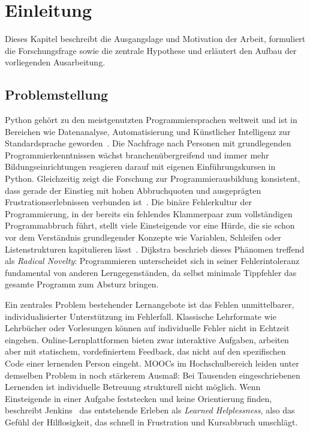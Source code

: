 \clearpage

\chapter{\textbf{Einleitung}}\label{ch:einleitung}

Dieses Kapitel beschreibt die Ausgangslage und Motivation der Arbeit, formuliert die Forschungsfrage sowie die zentrale Hypothese und erläutert den Aufbau der vorliegenden Ausarbeitung.

\section{Problemstellung}\label{sec:problemstellung}

Python gehört zu den meistgenutzten Programmiersprachen weltweit und ist in Bereichen wie Datenanalyse, Automatisierung und Künstlicher Intelligenz zur Standardsprache geworden~\cite{stackoverflow2024}. Die Nachfrage nach Personen mit grundlegenden Programmierkenntnissen wächst branchenübergreifend und immer mehr Bildungseinrichtungen reagieren darauf mit eigenen Einführungskursen in Python. Gleichzeitig zeigt die Forschung zur Programmierausbildung konsistent, dass gerade der Einstieg mit hohen Abbruchquoten und ausgeprägten Frustrationserlebnissen verbunden ist~\cite{bennedsen2007}. Die binäre Fehlerkultur der Programmierung, in der bereits ein fehlendes Klammerpaar zum vollständigen Programmabbruch führt, stellt viele Einsteigende vor eine Hürde, die sie schon vor dem Verständnis grundlegender Konzepte wie Variablen, Schleifen oder Listenstrukturen kapitulieren lässt~\cite{jenkins2002}. Dijkstra beschrieb dieses Phänomen treffend als \textit{Radical Novelty}: Programmieren unterscheidet sich in seiner Fehlerintoleranz fundamental von anderen Lerngegenständen, da selbst minimale Tippfehler das gesamte Programm zum Absturz bringen.

Ein zentrales Problem bestehender Lernangebote ist das Fehlen unmittelbarer, individualisierter Unterstützung im Fehlerfall. Klassische Lehrformate wie Lehrbücher oder Vorlesungen können auf individuelle Fehler nicht in Echtzeit eingehen. Online-Lernplattformen bieten zwar interaktive Aufgaben, arbeiten aber mit statischem, vordefiniertem Feedback, das nicht auf den spezifischen Code einer lernenden Person eingeht. MOOCs im Hochschulbereich leiden unter demselben Problem in noch stärkerem Ausmaß: Bei Tausenden eingeschriebenen Lernenden ist individuelle Betreuung strukturell nicht möglich. Wenn Einsteigende in einer Aufgabe feststecken und keine Orientierung finden, beschreibt Jenkins~\cite{jenkins2002} das entstehende Erleben als \textit{Learned Helplessness}, also das Gefühl der Hilflosigkeit, das schnell in Frustration und Kursabbruch umschlägt.

